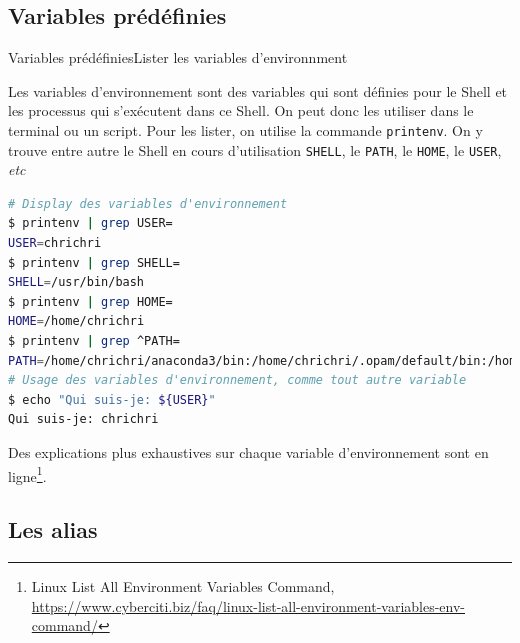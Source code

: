 \documentclass{beamer}
\begin{document}
    \subsection{Variables prédéfinies}\label{subsec:variables-predefinies}

    \begin{frame}[fragile]{Variables prédéfinies}{Lister les variables d'environnment}
        \begin{footnotesize}
            Les variables d'environnement sont des variables qui sont définies pour le Shell et les processus qui s'exécutent dans ce Shell.
            On peut donc les utiliser dans le terminal ou un script.
            \bigbreak
            Pour les lister, on utilise la commande \lstinline{printenv}.
            On y trouve entre autre le Shell en cours d'utilisation \lstinline{SHELL}, le \lstinline{PATH}, le \lstinline{HOME}, le \lstinline{USER}, \textit{etc}
            \begin{lstlisting}[language=bash,basicstyle=\tiny\ttfamily]
# Display des variables d'environnement
$ printenv | grep USER=
USER=chrichri
$ printenv | grep SHELL=
SHELL=/usr/bin/bash
$ printenv | grep HOME=
HOME=/home/chrichri
$ printenv | grep ^PATH=
PATH=/home/chrichri/anaconda3/bin:/home/chrichri/.opam/default/bin:/home/chrichri/.cargo/bin:/home/chrichri/.local/bin:/usr/local/sbin:/usr/local/bin:/usr/sbin:/usr/bin:/sbin:/bin:/usr/games:/usr/local/games:/snap/bin:/snap/bin:/home/chrichri/.dotnet/tools
# Usage des variables d'environnement, comme tout autre variable
$ echo "Qui suis-je: ${USER}"
Qui suis-je: chrichri
            \end{lstlisting}
            Des explications plus exhaustives sur chaque variable d'environnement sont en ligne\footnote{Linux List All Environment Variables Command, \url{https://www.cyberciti.biz/faq/linux-list-all-environment-variables-env-command/}}.
        \end{footnotesize}
    \end{frame}

    \subsection{Les alias}\label{subsec:alias}
\end{document}
